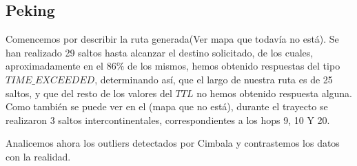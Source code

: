 \subsection{Peking}

Comencemos por describir la ruta generada(Ver mapa que todavía no está). Se han realizado 29 saltos hasta alcanzar el destino solicitado, de los cuales, aproximadamente en el $86 \% $ de los mismos, hemos obtenido respuestas del tipo $TIME\_EXCEEDED$, determinando así, que el largo de nuestra ruta es de 25 saltos, y que del resto de los valores del $TTL$ no hemos obtenido respuesta alguna. Como también se puede ver en el (mapa que no está), durante el trayecto se realizaron 3 saltos intercontinentales, correspondientes a los hops 9, 10 Y 20.


Analicemos ahora los outliers detectados por Cimbala y contrastemos los datos con la realidad.

